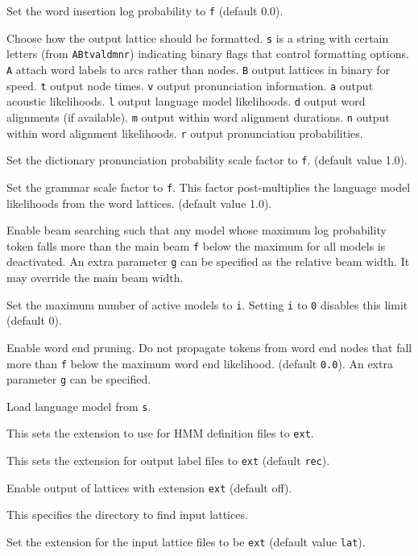 \begin{optlist}
    Set the word insertion log probability to \texttt{f} 
        (default 0.0).

   Choose how the output lattice should be formatted.
         \texttt{s} is a string with certain letters (from \texttt{ABtvaldmnr})
         indicating binary flags that control formatting options.
         \texttt{A} attach word labels to arcs rather than nodes.
         \texttt{B} output lattices in binary for speed.
         \texttt{t} output node times.
         \texttt{v} output pronunciation information.
         \texttt{a} output acoustic likelihoods.
         \texttt{l} output language model likelihoods.
         \texttt{d} output word alignments (if available).
         \texttt{m} output within word alignment durations.
         \texttt{n} output within word alignment likelihoods.
         \texttt{r} output pronunciation probabilities.

   Set the dictionary pronunciation probability scale 
        factor to \texttt{f}. (default value 1.0).

   Set the grammar scale factor to \texttt{f}.
        This factor post-multiplies the language model likelihoods
        from the word lattices.  (default value 1.0).
 
   Enable beam searching such that any model whose 
        maximum log probability token falls more than the main beam
        \texttt{f} below the maximum for all models is deactivated. 
        An extra parameter \texttt{g} can be specified as the relative 
        beam width. It may override the main beam width.

   Set the maximum number of active models to \texttt{i}.
        Setting \texttt{i} to \texttt{0} disables this limit (default 0).

   Enable word end pruning.  Do not propagate tokens from
        word end nodes that fall more than \texttt{f} below the maximum 
        word end likelihood.  (default \texttt{0.0}). 
        An extra parameter \texttt{g} can be specified.

   Load language model from \texttt{s}.

    This sets the extension to use for HMM definition
      files to \texttt{ext}.

    This sets the extension for output label files to
        \texttt{ext} (default \texttt{rec}).

    Enable output of lattices with extension \texttt{ext}
                   (default off).

   This specifies the directory to find input lattices. 


   Set the extension for the input lattice files 
        to be \texttt{ext}  (default value \texttt{lat}).

\stdoptE
\stdoptF
\stdoptG
\stdoptH
\stdoptJ
\stdoptK
\stdoptP

\end{optlist}

